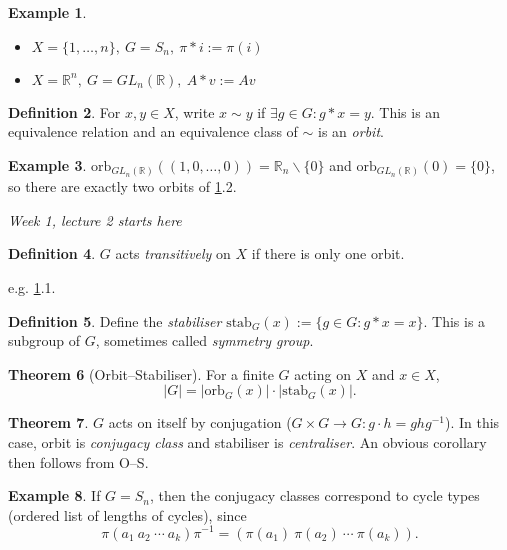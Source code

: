 \documentclass[a4paper]{article}
\newcommand{\R}{\mathbb{R}}
\newcommand{\orb}{\text{orb}}
\newcommand{\stab}{\text{stab}}
\theoremstyle{definition}
\newtheorem{defn}{Definition}[subsection]
\newtheorem{thm}[defn]{Theorem}
\newtheorem{example}[defn]{Example}
\begin{document}
\begin{example}
\label{example:gpact}
\begin{itemize}
\item $X=\{1,\ldots,n\},\ G=S_n,\ \pi\ast i:=\pi(i)$
\item $X=\R^n,\ G=GL_n(\R),\ A\ast v:=Av$
\end{itemize}
\end{example}

\begin{defn}
For $x,y\in X$, write $x\sim y$ if $\exists g\in G:g\ast x=y$. This is an equivalence relation and an equivalence class of $\sim$ is an \textit{orbit}.
\end{defn}

\begin{example}
$\orb_{GL_n(\R)}((1,0,\ldots,0))=\mathbb R_n\backslash\{0\}$ and $\orb_{GL_n(\R)}(0)=\{0\}$, so there are exactly two orbits of \ref{example:gpact}.2.
\end{example}

\begin{flushright}
\textit{Week 1, lecture 2 starts here}
\end{flushright}

\begin{defn}
$G$ acts \textit{transitively} on $X$ if there is only one orbit.
\end{defn}
e.g. \ref{example:gpact}.1.

\begin{defn}
Define the \textit{stabiliser} $\stab_G(x):=\{g\in G:g\ast x=x\}$. This is a subgroup of $G$, sometimes called \textit{symmetry group}.
\end{defn}

\begin{thm}[Orbit–Stabiliser]
For a finite $G$ acting on $X$ and $x\in X$,
\[
|G|=|\orb_G(x)|\cdot |\stab_G(x)|.
\]
\end{thm}

\begin{thm}
$G$ acts on itself by conjugation ($G\times G\rightarrow G:g\cdot h=ghg^{-1}$). In this case, orbit is \textit{conjugacy class} and stabiliser is \textit{centraliser}. An obvious corollary then follows from O–S.
\end{thm}

\begin{example}
\label{example:Snconjclas}
If $G=S_n$, then the conjugacy classes correspond to cycle types (ordered list of lengths of cycles), since
\[
\pi (a_1\ a_2\ \cdots \ a_k)\pi^{-1}=(\pi(a_1) \ \pi(a_2) \ \cdots \ \pi(a_k)).
\]
\end{example}
\end{document}
